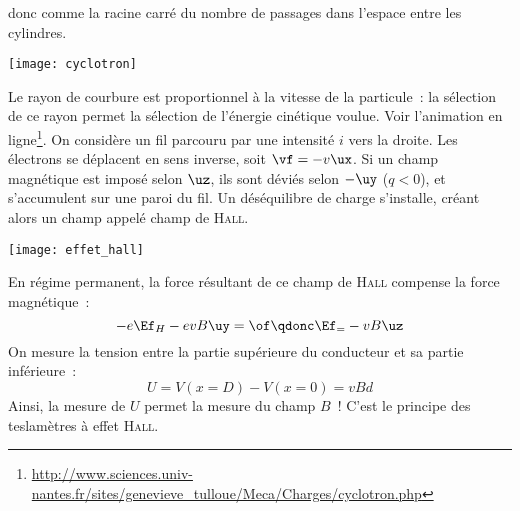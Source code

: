 \documentclass[../main/main.tex]{subfiles}
\begin{document}
\begin{itemize}[label=$\diamond$]
        donc comme la racine carré du nombre de passages dans l'espace entre les
        cylindres.
        \begin{center}
            \texttt{[image: cyclotron]}
            \label{fig:cyclotron}
        \end{center}
        Le rayon de courbure est proportionnel à la vitesse de la particule~: la
        sélection de ce rayon permet la sélection de l'énergie cinétique
        voulue. Voir l'animation en
        ligne\footnote{\url{http://www.sciences.univ-nantes.fr/sites/genevieve_tulloue/Meca/Charges/cyclotron.php}}.
        \bigbreak
     On considère un fil parcouru par une intensité
        $i$ vers la droite. Les électrons se déplacent en sens inverse, soit
        $\vf = -v\ux$. Si un champ magnétique est imposé selon $\uz$, ils sont
        déviés selon $-\uy$ ($q < 0$), et s'accumulent sur une paroi du fil. Un
        déséquilibre de charge s'installe, créant alors un champ appelé champ de
        \textsc{Hall}.
        \begin{center}
            \texttt{[image: effet\_hall]}
            \label{fig:hall}
        \end{center}
        En régime permanent, la force résultant de ce champ de \textsc{Hall}
        compense la force magnétique~:
        \[
            -e\Ef_H -evB\uy = \of
            \qdonc
            \Ef_ = -vB\uz
        \]
        On mesure la tension entre la partie supérieure du conducteur et sa
        partie inférieure~:
        \[U = V(x=D) - V(x=0) = vBd\]
        Ainsi, la mesure de $U$ permet la mesure du champ $B$~! C'est le
        principe des teslamètres à effet \textsc{Hall}.
\end{itemize}
\end{document}
